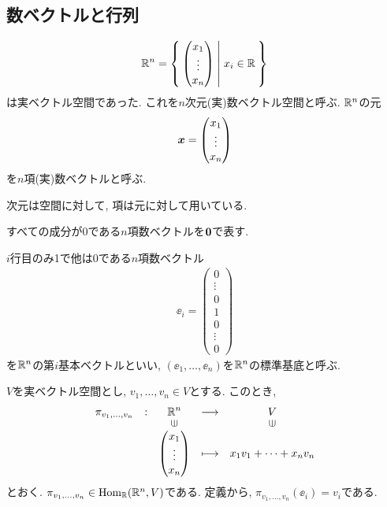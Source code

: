 \subsection{数ベクトルと行列}
\begin{align*}
  \mathbb{R}^n=
  \Set{\begin{pmatrix}x_1\\\vdots\\x_n\end{pmatrix}|x_i\in \mathbb{R}}
\end{align*}
は実ベクトル空間であった.
これを$n$次元(実)数ベクトル空間と呼ぶ.
$\mathbb{R}^n$の元
\begin{align*}
  \boldsymbol{x}=\begin{pmatrix}x_1\\\vdots\\x_n\end{pmatrix}
\end{align*}
を$n$項(実)数ベクトルと呼ぶ.
\begin{remark}
  次元は空間に対して, 項は元に対して用いている.
\end{remark}

すべての成分が0である$n$項数ベクトルを$\boldsymbol{0}$で表す.
\begin{definition}
  $i$行目のみ1で他は0である$n$項数ベクトル
  \begin{align*}
    \ee_i=\begin{pmatrix}0\\\vdots\\0\\1\\0\\\vdots\\0\end{pmatrix}
  \end{align*}
  を$\mathbb{R}^n$の第$i$基本ベクトルといい,
  $(\ee_1,\ldots,\ee_n)$を$\mathbb{R}^n$の標準基底と呼ぶ.
\end{definition}

$V$を実ベクトル空間とし,
$v_1,\ldots,v_n\in V$とする.
このとき,
\begin{align*}
  \shazo{\pi_{v_1,\ldots,v_n}}
        {\RR^n}{V}
        {\begin{pmatrix}x_1\\\vdots\\x_n\end{pmatrix}}{x_1v_1+\cdots+x_nv_n}
\end{align*}
とおく.
$\pi_{v_1,\ldots,v_n}\in \operatorname{Hom}_{\mathbb{R}}(\mathbb{R}^n,V)$である.
定義から,
$\pi_{v_1,\ldots,v_n}(\ee_i)=v_i$である.

